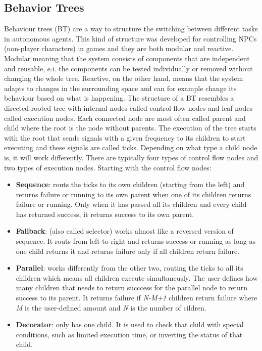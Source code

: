 \subsection{Behavior Trees}
Behaviour trees (BT) are a way to structure the switching between different tasks in autonomous agents. This kind 
of structure was developed for controlling NPCs (non-player characters) in games and they are both modular and reactive. 
Modular meaning that the system consists of components that are independent and reusable, e.i. the components can be 
tested individually or removed without changing the whole tree. Reactive, on the other hand, means that the system 
adapts to changes in the surrounding space and can for example change its behaviour based on what is happening. The 
structure of a BT resembles a directed rooted tree with internal nodes called control flow nodes and leaf nodes called 
execution nodes. Each connected node are most often called parent and child where the root is the node without parents. 
The execution of the tree starts with the root that sends signals with a given frequency to its children to start executing 
and these signals are called ticks. Depending on what type a child node is, it will work differently. There are typically 
four types of control flow nodes and two types of execution nodes. Starting with the control flow nodes:
\begin{itemize}
    \item \textbf{Sequence}: routs the ticks to its own children (starting from the left) and returns failure or running to its own parent when one of its children returns failure or running. Only when it has passed all its children and every child has returned success, it returns success to its own parent.
    \item \textbf{Fallback}: (also called selector) works almost like a reversed version of sequence. It routs from left to right and returns success or running as long as one child returns it and returns failure only if all children return failure. 
    \item \textbf{Parallel}: works differently from the other two, routing the ticks to all its children which means all children execute simultaneusly. The user defines how many children that needs to return succcess for the parallel node to return success to its parent. It returns failure if \textit{N-M+1} children return failure where \textit{M} is the user-defined amount and \textit{N} is the number of cildren.
    \item \textbf{Decorator}: only has one child. It is used to check that child with special conditions, such as limited execution time, or inverting the status of that child. 
\end{itemize}
